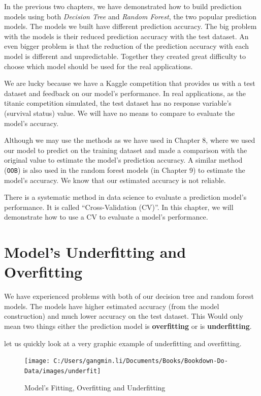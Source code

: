 \documentclass[
]{book}
\begin{document}
In the previous two chapters, we have demonstrated how to build prediction models using both \emph{Decision Tree} and \emph{Random Forest}, the two popular prediction models. The models we built have different prediction accuracy. The big problem with the models is their reduced prediction accuracy with the test dataset. An even bigger problem is that the reduction of the prediction accuracy with each model is different and unpredictable. Together they created great difficulty to choose which model should be used for the real applications.

We are lucky because we have a Kaggle competition that provides us with a test dataset and feedback on our model's performance. In real applications, as the titanic competition simulated, the test dataset has no response variable's (survival status) value. We will have no means to compare to evaluate the model's accuracy.

Although we may use the methods as we have used in Chapter 8, where we used our model to predict on the training dataset and made a comparison with the original value to estimate the model's prediction accuracy. A similar method (\texttt{OOB}) is also used in the random forest models (in Chapter 9) to estimate the model's accuracy. We know that our estimated accuracy is not reliable.

There is a systematic method in data science to evaluate a prediction model's performance. It is called ``Cross-Validation (CV)''. In this chapter, we will demonstrate how to use a CV to evaluate a model's performance.

\hypertarget{models-underfitting-and-overfitting}{%
\section{Model's Underfitting and Overfitting}\label{models-underfitting-and-overfitting}}

We have experienced problems with both of our decision tree and random forest models. The models have higher estimated accuracy (from the model construction) and much lower accuracy on the test dataset. This Would only mean two things either the prediction model is \textbf{overfitting} or is \textbf{underfitting}.

let us quickly look at a very graphic example of underfitting and overfitting.

\begin{figure}

{\centering \texttt{[image: C:/Users/gangmin.li/Documents/Books/Bookdown-Do-Data/images/underfit]} 

}

\caption{Model's Fitting, Overfitting and Underfitting}\label{fig:modelfit}
\end{figure}
\end{document}
